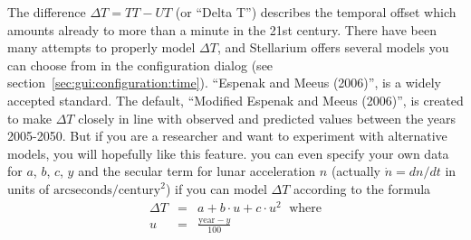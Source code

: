 The difference $\Delta T=TT-UT$ (or ``Delta T'') describes the
temporal offset which amounts already to more than a minute in the 21st
century. There have been many attempts to properly model $\Delta T$,
and Stellarium offers several models you can choose from in the
configuration dialog (see
section~\ref{sec:gui:configuration:time}). ``Espenak and
Meeus (2006)'', is a widely accepted standard. The default, ``Modified Espenak and
Meeus (2006)'', is created to make $\Delta T$ closely in line with observed and predicted
values between the years 2005-2050. But if you are a researcher and want to experiment
with alternative models, you will hopefully like this feature. you can even specify your own data for
$a$, $b$, $c$, $y$ and the secular term for lunar acceleration $n$
(actually $\dot{n}=dn/dt$ in units of
$\mathrm{arcseconds}/\mathrm{century}^2$) if you can model $\Delta T$
according to the formula
\begin{eqnarray}
  \label{eq:DeltaT:custom}
  \Delta T &=& a+ b\cdot u + c \cdot u^2 \, \ \ \text{where}\\
         u &=& \frac{\mathrm{year}-y}{100}
\end{eqnarray}

